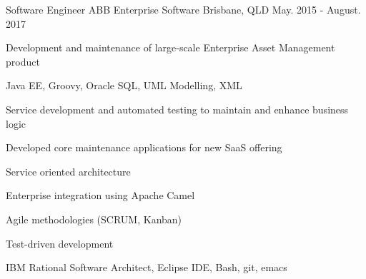 \begin{cventries}
  \cventry
    {Software Engineer} %
    {ABB Enterprise Software} %
    {Brisbane, QLD} %
    {May. 2015 - August. 2017} %
    {
      \begin{cvitems} %
        \item {Development and maintenance of large-scale Enterprise Asset Management product}
        \item {Java EE, Groovy, Oracle SQL, UML Modelling, XML}
        \item {Service development and automated testing to maintain and enhance business logic}
        \item {Developed core maintenance applications for new SaaS offering}
        \item {Service oriented architecture}
        \item {Enterprise integration using Apache Camel}
        \item {Agile methodologies (SCRUM, Kanban)}
        \item {Test-driven development}
        \item {IBM Rational Software Architect, Eclipse IDE, Bash, git, emacs}
      \end{cvitems}
    }

\end{cventries}

